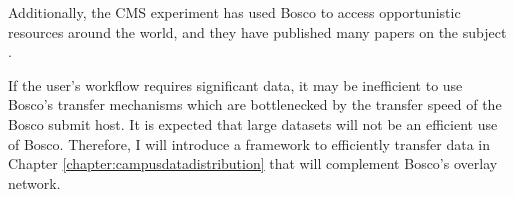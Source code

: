 Additionally, the CMS experiment has used Bosco to access opportunistic resources around the world, and they have published many papers on the subject \cite{hufnagelcmsopportunistic, piperovoperationalchep15, wagner2013using, kreuzer2014opportunistic}.

If the user's workflow requires significant data, it may be inefficient to use Bosco's transfer mechanisms which are bottlenecked by the transfer speed of the Bosco submit host.  It is expected that large datasets will not be an efficient use of Bosco.  Therefore, I will introduce a framework to efficiently transfer data in Chapter \ref{chapter:campusdatadistribution} that will complement Bosco's overlay network.



